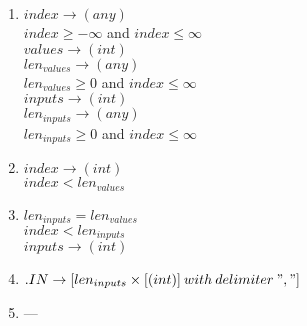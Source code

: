 \documentclass[11pt]{article}
\begin{document}
\begin{enumerate}
  \item $index \rightarrow (any)$\\
  $index \geq -\infty$ and $index \leq \infty$\\
  $values \rightarrow (int)$\\
  $len_{values} \rightarrow (any)$\\
  $len_{values} \geq 0$ and $index \leq \infty$\\
  $inputs \rightarrow (int)$\\
  $len_{inputs} \rightarrow (any)$\\
  $len_{inputs} \geq 0$ and $index \leq \infty$
  
  \item $index \rightarrow (int)$\\
  $index < len_{values}$

  \item $len_{inputs} = len_{values}$\\
  $index < len_{inputs}$\\
  $inputs \rightarrow (int)$

  \item $.IN \rightarrow [len_{inputs}\times[(int)]\:with\:delimiter\:","]$\\

  \item ---  
\end{enumerate}
\end{document}
